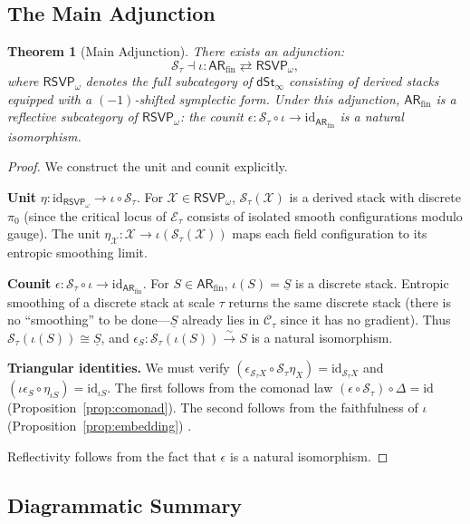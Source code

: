 \documentclass[a4paper,12pt]{article}
\newtheorem{theorem}{Theorem}[section]
\theoremstyle{definition}
\newcommand{\ARfin}{\mathsf{AR}_{\mathrm{fin}}}
\newcommand{\RSVPomega}{\mathsf{RSVP}_\omega}
\newcommand{\dSt}{\mathsf{dSt}_\infty}
\newcommand{\Stau}{\mathcal{S}_\tau}
\newcommand{\Etau}{\mathcal{E}_\tau}
\newcommand{\iotaf}{\iota}
\newcommand{\Ctau}{\mathcal{C}_\tau}
\newcommand{\X}{\mathcal{X}}
\begin{document}
\subsection{The Main Adjunction}

\begin{theorem}[Main Adjunction]
\label{thm:adjunction}
There exists an adjunction:
\[
\Stau \dashv \iotaf: \ARfin \rightleftarrows \RSVPomega,
\]
where $\RSVPomega$ denotes the full subcategory of $\dSt$ consisting of derived stacks equipped with a $(-1)$-shifted symplectic form. Under this adjunction, $\ARfin$ is a reflective subcategory of $\RSVPomega$: the counit $\epsilon: \Stau \circ \iotaf \to \mathrm{id}_{\ARfin}$ is a natural isomorphism.
\end{theorem}

\begin{proof}
We construct the unit and counit explicitly.

\textbf{Unit} $\eta: \mathrm{id}_{\RSVPomega} \to \iotaf \circ \Stau$. For $\X \in \RSVPomega$, $\Stau(\X)$ is a derived stack with discrete $\pi_0$ (since the critical locus of $\Etau$ consists of isolated smooth configurations modulo gauge). The unit $\eta_\X: \X \to \iotaf(\Stau(\X))$ maps each field configuration to its entropic smoothing limit.

\textbf{Counit} $\epsilon: \Stau \circ \iotaf \to \mathrm{id}_{\ARfin}$. For $S \in \ARfin$, $\iotaf(S) = \underline{S}$ is a discrete stack. Entropic smoothing of a discrete stack at scale $\tau$ returns the same discrete stack (there is no ``smoothing'' to be done—$\underline{S}$ already lies in $\Ctau$ since it has no gradient). Thus $\Stau(\iotaf(S)) \cong \underline{S}$, and $\epsilon_S: \Stau(\iotaf(S)) \xrightarrow{\sim} S$ is a natural isomorphism.

\textbf{Triangular identities.} We must verify $(\epsilon_{\Stau X} \circ \Stau \eta_X) = \mathrm{id}_{\Stau X}$ and $(\iotaf \epsilon_S \circ \eta_{\iotaf S}) = \mathrm{id}_{\iotaf S}$. The first follows from the comonad law $(\epsilon \circ \Stau) \circ \Delta = \mathrm{id}$ (Proposition~\ref{prop:comonad}). The second follows from the faithfulness of $\iotaf$ (Proposition~\ref{prop:embedding}) \cite{Lurie2009, MacLane1998}.

Reflectivity follows from the fact that $\epsilon$ is a natural isomorphism.
\end{proof}

\subsection{Diagrammatic Summary}
\end{document}
